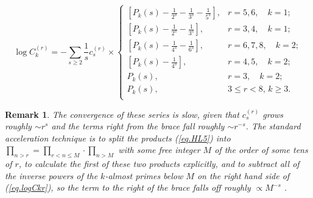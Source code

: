 \documentclass{amsart}
\newtheorem{rem}{Remark}
\begin{document}
\begin{equation}
\log C_k^{(r)} =
- \sum_{s\ge 2} \frac{1}{s}c^{(r)}_{s}
\times\left\{ 
\begin{array}{ll}
\left[ P_k(s)-\frac{1}{2^s}-\frac{1}{3^s}-\frac{1}{5^s}\right], & r=5,6,\quad k=1  ; \\
\left[ P_k(s)-\frac{1}{2^s}-\frac{1}{3^s}\right], & r=3,4,\quad k=1;  \\
\left[ P_k(s)-\frac{1}{4^s}-\frac{1}{6^s}\right], & r=6,7,8,\quad k=2;   \\
\left[ P_k(s)-\frac{1}{4^s}\right], & r=4,5,\quad k=2;   \\
P_k(s), & r=3,\quad k=2;   \\
P_k(s), & 3\le r<8,\, k\ge 3. \\
\end{array}
\right.
\label{eq.logCkr}
\end{equation}
\begin{rem}
The convergence of these series is slow, given that $c_s^{(r)}$
grows roughly $\sim r^s$ and
the terms right from the brace
fall
roughly $\sim r^{-s}$.
The standard acceleration technique is to split the products (\ref{eq.HL5})
into $\prod_{n>r}=\prod_{r<n\le M}\cdot \prod_{n>M}$ with some free integer
$M$ of the order of some tens of $r$, to calculate the first of these
two products explicitly, and to subtract
all of the inverse powers of the $k$-almost primes below $M$
on the right hand side of (\ref{eq.logCkr}), so the
term to the right of the brace
falls off roughly $\propto M^{-s}$
\cite{SebahGourdon}.
\end{rem}
\end{document}
